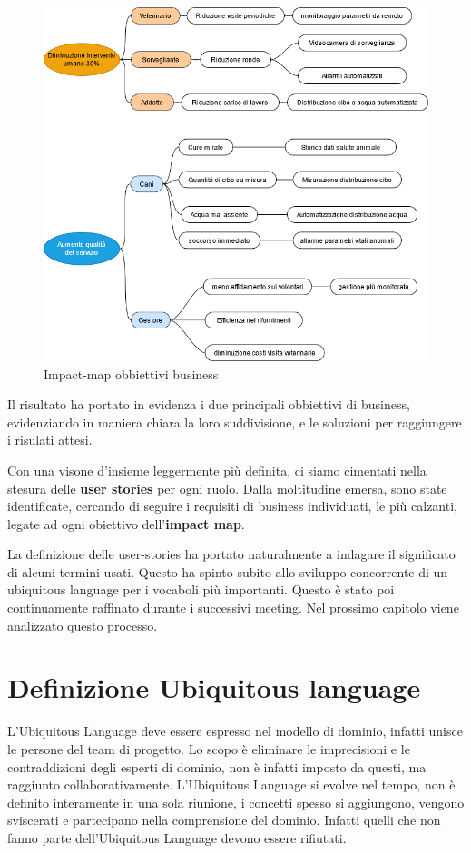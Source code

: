     \begin{figure}[ht]
        \caption{Impact-map obbiettivi business}
        \centering
        \includegraphics[width=1\textwidth]{DrawIo/impactMap.png}
    \end{figure}

    Il risultato ha portato in evidenza i due principali obbiettivi di business, evidenziando in maniera chiara la loro suddivisione, e le soluzioni per raggiungere i risulati attesi.
    
    Con una visone d'insieme leggermente più definita, ci siamo cimentati nella stesura delle \textbf{user stories} per ogni ruolo. Dalla moltitudine emersa, sono state identificate, cercando di seguire i requisiti di business individuati,  le più calzanti, legate ad ogni obiettivo dell'\textbf{impact map}.

	La definizione delle user-stories ha portato naturalmente a indagare il significato di alcuni termini usati. Questo ha spinto subito allo sviluppo concorrente di un ubiquitous language per i vocaboli più importanti. Questo è stato poi continuamente raffinato durante i successivi meeting. 
	Nel prossimo capitolo viene analizzato questo processo. 
    
	\section{Definizione Ubiquitous language}	
	L'Ubiquitous Language deve essere espresso nel modello di dominio, infatti unisce le persone del team di progetto.
    Lo scopo è eliminare le imprecisioni e le contraddizioni degli esperti di dominio, non è infatti imposto da questi, ma raggiunto collaborativamente.
    L'Ubiquitous Language si evolve nel tempo, non è definito interamente in una sola riunione, i concetti spesso si aggiungono, vengono sviscerati e partecipano nella comprensione del dominio. Infatti quelli che non fanno parte dell'Ubiquitous Language devono essere rifiutati.
    

